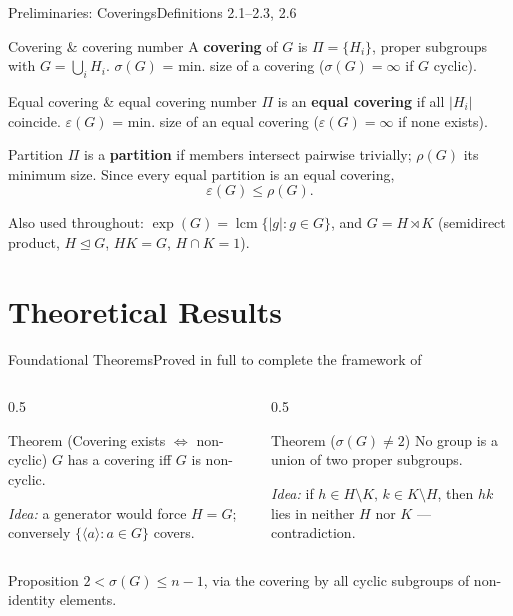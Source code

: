 \documentclass[9pt,aspectratio=169]{beamer}
\newcommand{\eps}{\varepsilon}
\begin{document}
\begin{frame}{Preliminaries: Coverings}{Definitions 2.1--2.3, 2.6}
\begin{block}{Covering \& covering number}
A \textbf{covering} of $G$ is $\Pi = \{H_i\}$, proper subgroups with $G = \bigcup_i H_i$.
$\sigma(G)$ = min. size of a covering ($\sigma(G)=\infty$ if $G$ cyclic).
\end{block}
\begin{exampleblock}{Equal covering \& equal covering number}
$\Pi$ is an \textbf{equal covering} if all $|H_i|$ coincide. $\eps(G)$ = min. size of an equal covering ($\eps(G) = \infty$ if none exists).
\end{exampleblock}
\begin{alertblock}{Partition}
$\Pi$ is a \textbf{partition} if members intersect pairwise trivially; $\rho(G)$ its minimum size. Since every equal partition is an equal covering,
\[
\eps(G) \le \rho(G).
\]
\end{alertblock}
\vspace{4pt}
Also used throughout: $\exp(G) = \operatorname{lcm}\{|g| : g\in G\}$, and $G = H\rtimes K$ (semidirect product, $H\trianglelefteq G$, $HK=G$, $H\cap K=1$).
\end{frame}

\section{Theoretical Results}

\begin{frame}{Foundational Theorems}{Proved in full to complete the framework of \cite{vb}}
\begin{columns}[T]
\begin{column}{0.5\textwidth}
\begin{block}{Theorem (Covering exists $\iff$ non-cyclic)}
$G$ has a covering iff $G$ is non-cyclic.
\end{block}
\vspace{2pt}
\textit{Idea:} a generator would force $H=G$; conversely $\{\langle a\rangle : a\in G\}$ covers.
\end{column}
\begin{column}{0.5\textwidth}
\begin{block}{Theorem ($\sigma(G)\ne 2$)}
No group is a union of two proper subgroups.
\end{block}
\vspace{2pt}
\textit{Idea:} if $h\in H\setminus K,\, k\in K\setminus H$, then $hk$ lies in neither $H$ nor $K$ — contradiction.
\end{column}
\end{columns}
\vspace{8pt}
\begin{exampleblock}{Proposition}
$2 < \sigma(G) \le n-1$, via the covering by all cyclic subgroups of non-identity elements.
\end{exampleblock}
\end{frame}
\end{document}
